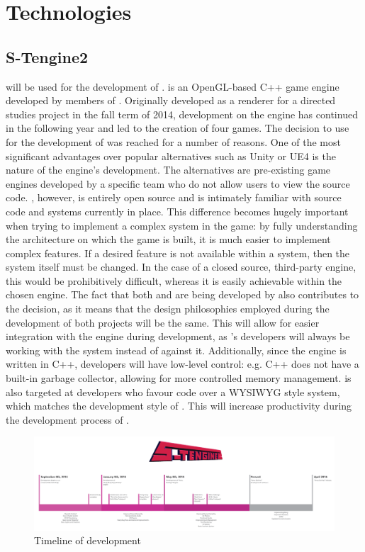 \section{Technologies}

\subsection{S-Tengine2}
\ourengine{} will be used for the development of \ourgame{}. \ourengine{} is an OpenGL-based C++ game engine developed by members of \ourteam{}. Originally developed as a renderer for a directed studies project in the fall term of 2014, development on the engine has continued in the following year and led to the creation of four games. The decision to use \ourengine{} for the development of \ourgame{} was reached for a number of reasons. One of the most significant advantages over popular alternatives such as Unity or UE4 is the nature of the engine's development. The alternatives are pre-existing game engines developed by a specific team who do not allow users to view the source code. \ourengine{}, however, is entirely open source and \ourteam{} is intimately familiar with source code and systems currently in place. This difference becomes hugely important when trying to implement a complex system in the game: by fully understanding the architecture on which the game is built, it is much easier to implement complex features. If a desired feature is not available within a system, then the system itself must be changed. In the case of a closed source, third-party engine, this would be prohibitively difficult, whereas it is easily achievable within the chosen engine. The fact that both \ourengine{} and \ourgame{} are being developed by \ourteam{} also contributes to the decision, as it means that the design philosophies employed during the development of both projects will be the same. This will allow for easier integration with the engine during development, as \ourteam{}'s developers will always be working with the system instead of against it. Additionally, since the engine is written in C++, developers will have low-level control: e.g. C++ does not have a built-in garbage collector, allowing for more controlled memory management. \ourengine{} is also targeted at developers who favour code over a WYSIWYG style system, which matches the development style of \ourteam{}. This will increase productivity during the development process of \ourgame{}.

\begin{figure}[p]
\includegraphics[width=0.95\linewidth]{images/timeline}
\caption{Timeline of \ourengine{} development}
\end{figure}

